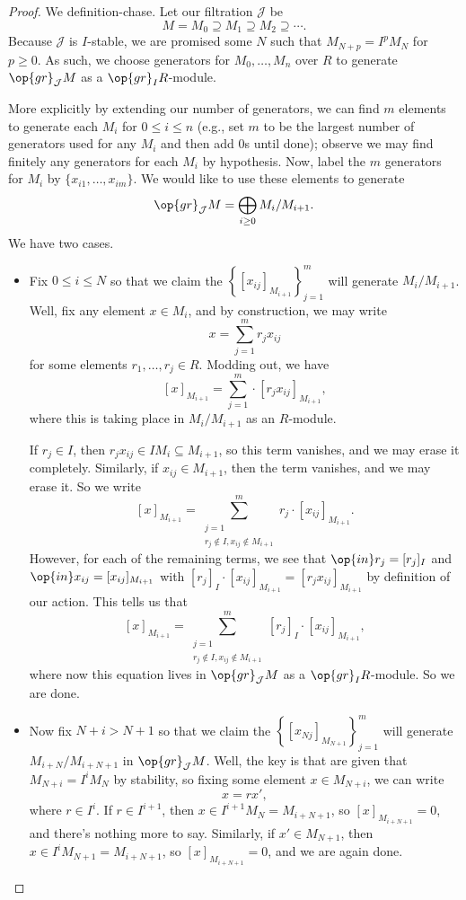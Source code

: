 \begin{proof}
	We definition-chase. Let our filtration $\mathcal J$ be
	\[M=M_0\supseteq M_1\supseteq M_2\supseteq\cdots.\]
	Because $\mathcal J$ is $I$-stable, we are promised some $N$ such that $M_{N+p}=I^pM_N$ for $p\ge0$. As such, we choose generators for $M_0,\ldots,M_n$ over $R$ to generate $\op{gr}_\mathcal JM$ as a $\op{gr}_IR$-module.

	More explicitly by extending our number of generators, we can find $m$ elements to generate each $M_i$ for $0\le i\le n$ (e.g., set $m$ to be the largest number of generators used for any $M_i$ and then add $0$s until done); observe we may find finitely any generators for each $M_i$ by hypothesis. Now, label the $m$ generators for $M_i$ by $\{x_{i1},\ldots,x_{im}\}$. We would like to use these elements to generate
	\[\op{gr}_\mathcal JM=\bigoplus_{i\ge0}M_i/M_{i+1}.\]
	We have two cases.
	\begin{itemize}
		\item Fix $0\le i\le N$ so that we claim the $\left\{[x_{ij}]_{M_{i+1}}\right\}_{j=1}^m$ will generate $M_i/M_{i+1}$. Well, fix any element $x\in M_i$, and by construction, we may write
		\[x=\sum_{j=1}^mr_jx_{ij}\]
		for some elements $r_1,\ldots,r_j\in R$. Modding out, we have
		\[[x]_{M_{i+1}}=\sum_{j=1}^m\cdot[r_jx_{ij}]_{M_{i+1}},\]
		where this is taking place in $M_i/M_{i+1}$ as an $R$-module.
		
		If $r_j\in I$, then $r_jx_{ij}\in IM_i\subseteq M_{i+1}$, so this term vanishes, and we may erase it completely. Similarly, if $x_{ij}\in M_{i+1}$, then the term vanishes, and we may erase it. So we write
		\[[x]_{M_{i+1}}=\sum_{\substack{j=1\\r_j\notin I,x_{ij}\notin M_{i+1}}}^mr_j\cdot[x_{ij}]_{M_{i+1}}.\]
		However, for each of the remaining terms, we see that $\op{in}r_j=[r_j]_I$ and $\op{in}x_{ij}=[x_{ij}]_{M_{i+1}}$ with $[r_j]_I\cdot[x_{ij}]_{M_{i+1}}=[r_jx_{ij}]_{M_{i+1}}$ by definition of our action. This tells us that
		\[[x]_{M_{i+1}}=\sum_{\substack{j=1\\r_j\notin I,x_{ij}\notin M_{i+1}}}^m[r_j]_I\cdot[x_{ij}]_{M_{i+1}},\]
		where now this equation lives in $\op{gr}_\mathcal JM$ as a $\op{gr}_IR$-module. So we are done.

		\item Now fix $N+i>N+1$ so that we claim the $\left\{[x_{Nj}]_{M_{N+1}}\right\}_{j=1}^m$ will generate $M_{i+N}/M_{i+N+1}$ in $\op{gr}_\mathcal JM$. Well, the key is that are given that $M_{N+i}=I^iM_N$ by stability, so fixing some element $x\in M_{N+i}$, we can write
		\[x=rx',\]
		where $r\in I^i$. If $r\in I^{i+1}$, then $x\in I^{i+1}M_N=M_{i+N+1}$, so $[x]_{M_{i+N+1}}=0$, and there's nothing more to say. Similarly, if $x'\in M_{N+1}$, then $x\in I^iM_{N+1}=M_{i+N+1}$, so $[x]_{M_{i+N+1}}=0$, and we are again done.


\end{itemize}
\end{proof}
